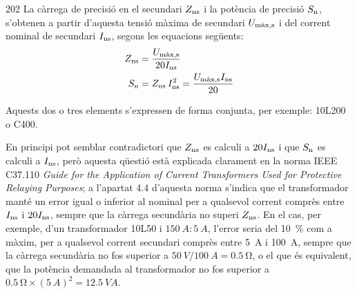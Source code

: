 \begin{dingautolist}{202}
    La càrrega de precisió en el secundari
    $Z_\mathrm{ns}$ i la potència de precisió $S_\mathrm{n}$, s'obtenen a partir d'aquesta
    tensió màxima de secundari $U_\mathrm{m\grave{a}x,s}$
    i del corrent     nominal de secundari $I_\mathrm{ns}$, segons les equacions següents:
    \begin{align}
        Z_\mathrm{ns} &= \frac{U_\mathrm{m\grave{a}x,s}}{20 I_\mathrm{ns}}\\
        S_\mathrm{n} &= Z_\mathrm{ns} \,I_\mathrm{ns}^2 = \frac{U_\mathrm{m\grave{a}x,s} I_\mathrm{ns}}{20}
        \label{eq:sn_ti_ieee}
    \end{align}
\end{dingautolist}

Aquests dos o tres elements s'expressen de forma conjunta, per exemple:
10L200 o C400.

En principi pot semblar contradictori que $Z_\mathrm{ns}$ es calculi a $20 I_\mathrm{ns}$ i que $S_\mathrm{n}$ es calculi a $I_\mathrm{ns}$, però aquesta qüestió està explicada clarament en la norma IEEE C37.110 \textit{ Guide for the Application of Current Transformers Used for Protective Relaying Purposes}; a l'apartat 4.4 d'aquesta norma s'indica que el transformador manté un error igual o inferior al nominal per a qualsevol corrent comprès entre $I_\mathrm{ns}$ i $20 I_\mathrm{ns}$, sempre que la càrrega secundària no superi $Z_\mathrm{ns}$. En el cas, per exemple, d'un transformador 10L50 i $\qty{150}{A}\!:\!\qty{5}{A}$, l'error seria del \qty{10}{\percent} com a màxim, per a qualsevol corrent  secundari comprès entre \qty{5}{A} i \qty{100}{A}, sempre que la càrrega secundària no fos superior a $\qty{50}{V} / \qty{100}{A}= \qty{0,5}{\ohm}$, o el que és equivalent, que la potència  demandada al transformador no fos superior a $\qty{0,5}{\ohm} \times (\qty{5}{A})^2 = \qty{12,5}{VA}$.


